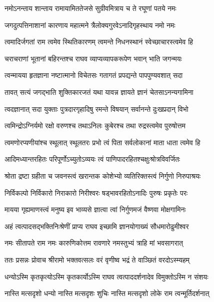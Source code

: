 \twolineshloka
{नमोऽनन्ताय शान्ताय रामायामिततेजसे}
{सुग्रीवमित्राय च ते रघूणां पतये नमः} %

\twolineshloka
{जगदुत्पत्तिनाशानां कारणाय महात्मने}
{त्रैलोक्यगुरवेऽनादिगृहस्थाय नमो नमः} %

\twolineshloka
{त्वमादिर्जगतां राम त्वमेव स्थितिकारणम्}
{त्वमन्ते निधनस्थानं स्वेच्छाचारस्त्वमेव हि} %

\twolineshloka
{चराचराणां भूतानां बहिरन्तश्च राघव}
{व्याप्यव्यापकरूपेण भवान् भाति जगन्मयः} %

\twolineshloka
{त्वन्मायया हृतज्ञाना नष्टात्मानो विचेतसः}
{गतागतं प्रपद्यन्ते पापपुण्यवशात् सदा} %

\twolineshloka
{तावत् सत्यं जगद्भाति शुक्तिकारजतं यथा}
{यावन्न ज्ञायते ज्ञानं चेतसाऽनन्यगामिना} %

\twolineshloka
{त्वदज्ञानात् सदा युक्ताः पुत्रदारगृहादिषु}
{रमन्ते विषयान् सर्वानन्ते दुःखप्रदान् विभो} %

\twolineshloka
{त्वमिन्द्रोऽग्निर्यमो रक्षो वरुणश्च तथाऽनिलः}
{कुबेरश्च तथा रुद्रस्त्वमेव पुरुषोत्तम} %

\twolineshloka
{त्वमणोरप्यणीयांश्च स्थूलात् स्थूलतरः प्रभो}
{त्वं पिता सर्वलोकानां माता धाता त्वमेव हि} %

\twolineshloka
{आदिमध्यान्तरहितः परिपूर्णोऽच्युतोऽव्ययः}
{त्वं पाणिपादरहितश्चक्षुःश्रोत्रविवर्जितः} %

\twolineshloka
{श्रोता द्रष्टा ग्रहीता च जवनस्त्वं खरान्तक}
{कोशेभ्यो व्यतिरिक्तस्त्वं निर्गुणो निरुपाश्रयः} %

\twolineshloka
{निर्विकल्पो निर्विकारो निराकारो निरीश्वरः}
{षड्भावरहितोऽनादिः पुरुषः प्रकृतेः परः} %

\twolineshloka
{मायया गृह्यमाणस्त्वं मनुष्य इव भाव्यसे}
{ज्ञात्वा त्वां निर्गुणमजं वैष्णवा मोक्षगामिनः} %

\twolineshloka
{अहं त्वत्पादसद्भक्तिनिःश्रेणीं प्राप्य राघव}
{इच्छामि ज्ञानयोगाख्यं सौधमारोढुमीश्वर} %

\twolineshloka
{नमः सीतापते राम नमः कारुणिकोत्तम}
{रावणारे नमस्तुभ्यं त्राहि मां भवसागरात्} %

\twolineshloka
{ततः प्रसन्नः प्रोवाच श्रीरामो भक्तवत्सलः}
{वरं वृणीष्व भद्रं ते वाञ्छितं वरदोऽस्म्यहम्} %


\twolineshloka
{धन्योऽस्मि कृतकृत्योऽस्मि कृतकार्योऽस्मि राघव}
{त्वत्पाददर्शनादेव विमुक्तोऽस्मि न संशयः} %

\twolineshloka
{नास्ति मत्सदृशो धन्यो नास्ति मत्सदृशः शुचिः}
{नास्ति मत्सदृशो लोके राम त्वन्मूर्तिदर्शनात्} %

